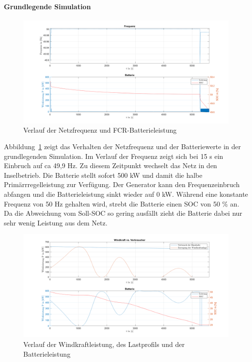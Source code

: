 \paragraph{Grundlegende Simulation}

\begin{figure}[h!]
	\centering
	\includegraphics[width=14cm]{Abbildungen/FreqBat2.png}
	\caption{Verlauf der Netzfrequenz und FCR-Batterieleistung}\label{Verlauf1}
\end{figure}

Abbildung~\ref{Verlauf1} zeigt das Verhalten der Netzfrequenz und der Batteriewerte in der grundlegenden Simulation.
Im Verlauf der Frequenz zeigt sich bei 15 s ein Einbruch auf ca 49,9 Hz. 
Zu diesem Zeitpunkt wechselt das Netz in den Inselbetrieb.
Die Batterie stellt sofort 500 kW und damit die halbe Primärrregelleistung zur Verfügung.
Der Generator kann den Frequenzeinbruch abfangen und die Batterieleistung sinkt wieder auf 0 kW.
Während eine konstante Frequenz von 50 Hz gehalten wird, strebt die Batterie einen SOC von 50 \% an.
Da die Abweichung vom Soll-SOC so gering ausfällt zieht die Batterie dabei nur sehr wenig Leistung aus dem Netz.

\begin{figure}[h!]
	\centering
	\includegraphics[width=14cm]{Abbildungen/VerbrBat.png}
	\caption{Verlauf der Windkraftleistung, des Lastprofils und der Batterieleistung}\label{Verlauf2}
\end{figure}

